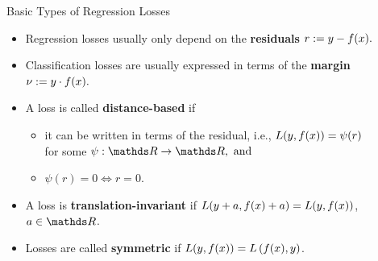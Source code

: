
\begin{vbframe}{Basic Types of Regression Losses}


\begin{itemize}
  \small
  \item Regression losses usually only depend on the \textbf{residuals}
  $r := y - f(x).$
  \item Classification losses are usually expressed in terms of the 
  \textbf{margin} $\nu := y \cdot f(x).$
  \item A loss is called \textbf{distance-based} if
  \begin{itemize}
    \small
    \item it can be written in terms of the residual, i.e., 
    $L(y, f(x)) = \psi (r)$ \\for some $\psi: \R \to \R, ~ \text{and}$
    \item $\psi(r) = 0 \Leftrightarrow r = 0$.
  \end{itemize}
  \item A loss is \textbf{translation-invariant} if $L(y + a, f(x) + a) = L(y, f(x))$, 
  $a \in \R$.
  \item Losses are called \textbf{symmetric} if $L(y, f(x)) = L\left(f(x), y\right)$. 
\end{itemize}

\vfill


\end{vbframe}
